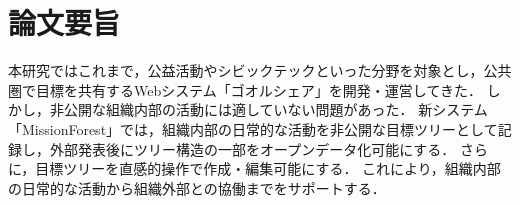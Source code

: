 \chapter*{論文要旨}
\label{chap0}
本研究ではこれまで，公益活動やシビックテックといった分野を対象とし，公共圏で目標を共有するWebシステム「ゴオルシェア」を開発・運営してきた．
しかし，非公開な組織内部の活動には適していない問題があった．
新システム「MissionForest」では，組織内部の日常的な活動を非公開な目標ツリーとして記録し，外部発表後にツリー構造の一部をオープンデータ化可能にする．
さらに，目標ツリーを直感的操作で作成・編集可能にする．
これにより，組織内部の日常的な活動から組織外部との協働までをサポートする．
